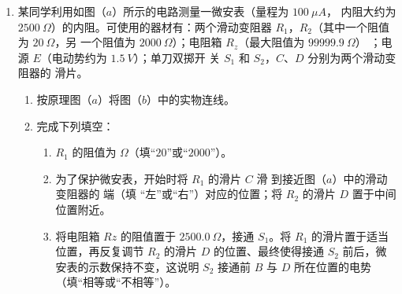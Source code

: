 \begin{enumerate}
\item 
{}
某同学利用如图（$ a $）所示的电路测量一微安表（量程为 $ 100 \ \mu A $，
内阻大约为 $ 2500 \ \Omega $）的内阻。可使用的器材有：两个滑动变阻器 $ R_{1} $，$ R_{2} $（其中一个阻值为 $ 20 \ \Omega $，另
一个阻值为 $ 2000 \ \Omega $）；电阻箱 $ R_z $（最大阻值为 $ 99999.9 \ \Omega $）
；电源 $ E $（电动势约为 $ 1.5 \ V $）；单刀双掷开
关 $ S_{1} $ 和 $ S_{2} $，$ C $、$ D $ 分别为两个滑动变阻器的
滑片。
\begin{figure}[h!]
\centering
\begin{subfigure}{0.4\linewidth}
\centering
 
\caption{}\label{}
\end{subfigure}
\begin{subfigure}{0.4\linewidth}
\centering
 
\caption{}\label{}
\end{subfigure}
\end{figure}




\begin{enumerate}
\item
按原理图（$ a $）将图（$ b $）中的实物连线。


\item 
完成下列填空：
\begin{enumerate}
\item
$ R_{1} $ 的阻值为
\underlinegap 
$ \Omega $（填“$ 20 $”或“$ 2000 $”）。

\item 
为了保护微安表，开始时将 $ R_{1} $ 的滑片 $ C $ 滑
到接近图（$ a $）中的滑动变阻器的
\underlinegap 
端（填
“左”或“右”）对应的位置；将 $ R_{2} $ 的滑片 $ D $ 置于中间位置附近。


\item 
将电阻箱 $ Rz $ 的阻值置于 $ 2500.0 \ \Omega $，接通 $ S_{1} $。将 $ R_{1} $ 的滑片置于适当位置，再反复调节 $ R_{2} $ 的滑片 $ D $
的位置、最终使得接通 $ S_{2} $ 前后，微安表的示数保持不变，这说明 $ S_{2} $ 接通前 $ B $ 与 $ D $ 所在位置的电势 \underlinegap 
（填“相等或“不相等”）。


\end{enumerate}
\end{enumerate}
\end{enumerate}
